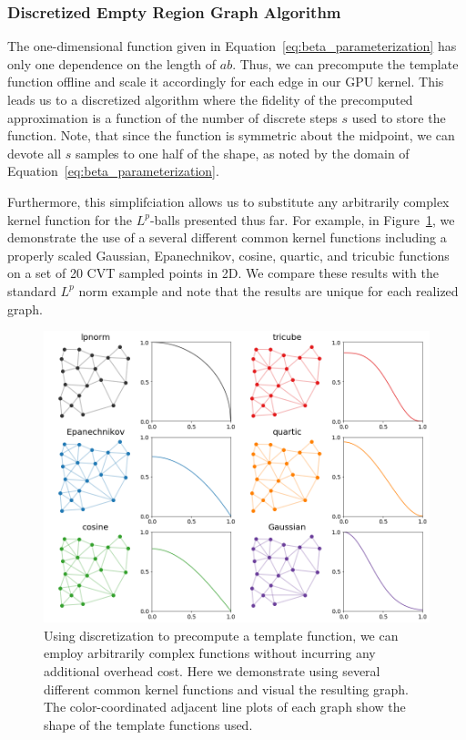 \subsubsection{Discretized Empty Region Graph Algorithm}
\label{sec:gpu_bp_discrete}

The one-dimensional function given in Equation~\ref{eq:beta_parameterization} has only one dependence on the length of $ab$.
%
Thus, we can precompute the template function offline and scale it accordingly for each edge in our GPU kernel.
%
This leads us to a discretized algorithm where the fidelity of the precomputed approximation is a function of the number of discrete steps $s$ used to store the function.
%
Note, that since the function is symmetric about the midpoint, we can devote all $s$ samples to one half of the shape, as noted by the domain of Equation~\ref{eq:beta_parameterization}.

Furthermore, this simplifciation allows us to substitute any arbitrarily complex kernel function for the $L^p$-balls presented thus far.
%
For example, in Figure~\ref{fig:discrete_beta}, we demonstrate the use of a several different common kernel functions including a properly scaled Gaussian, Epanechnikov, cosine, quartic, and tricubic functions on a set of 20 CVT sampled points in 2D.
%
We compare these results with the standard $L^p$ norm example and note that the results are unique for each realized graph.

\begin{figure}
    \includegraphics[width=\linewidth]{figs/chap7/beta_shapes.png}
    \caption{Using discretization to precompute a template function, we can employ arbitrarily complex functions without incurring any additional overhead cost.
    Here we demonstrate using several different common kernel functions and visual the resulting graph.
    The color-coordinated adjacent line plots of each graph show the shape of the template functions used.}
    \label{fig:discrete_beta}
\end{figure}

